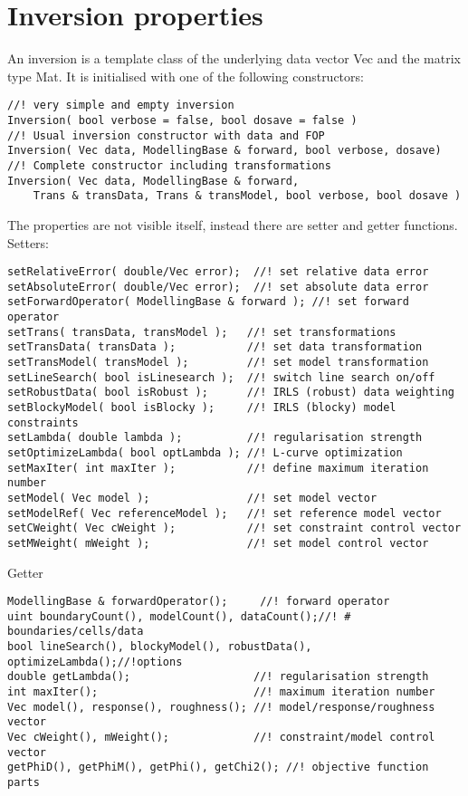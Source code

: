 \section{Inversion properties}
An inversion is a template class of the underlying data vector Vec and the matrix type Mat.
It is initialised with one of the following constructors:
\begin{lstlisting}
//! very simple and empty inversion
Inversion( bool verbose = false, bool dosave = false ) 
//! Usual inversion constructor with data and FOP
Inversion( Vec data, ModellingBase & forward, bool verbose, dosave)
//! Complete constructor including transformations
Inversion( Vec data, ModellingBase & forward, 
    Trans & transData, Trans & transModel, bool verbose, bool dosave )
\end{lstlisting}
The properties are not visible itself, instead there are setter and getter functions. Setters:
\begin{lstlisting}
setRelativeError( double/Vec error);  //! set relative data error
setAbsoluteError( double/Vec error);  //! set absolute data error
setForwardOperator( ModellingBase & forward ); //! set forward operator
setTrans( transData, transModel );   //! set transformations
setTransData( transData );           //! set data transformation
setTransModel( transModel );         //! set model transformation
setLineSearch( bool isLinesearch );  //! switch line search on/off
setRobustData( bool isRobust );      //! IRLS (robust) data weighting
setBlockyModel( bool isBlocky );     //! IRLS (blocky) model constraints
setLambda( double lambda );          //! regularisation strength
setOptimizeLambda( bool optLambda ); //! L-curve optimization
setMaxIter( int maxIter );           //! define maximum iteration number
setModel( Vec model );               //! set model vector
setModelRef( Vec referenceModel );   //! set reference model vector
setCWeight( Vec cWeight );           //! set constraint control vector
setMWeight( mWeight );               //! set model control vector
\end{lstlisting}
Getter%
\begin{lstlisting}
ModellingBase & forwardOperator();     //! forward operator
uint boundaryCount(), modelCount(), dataCount();//! # boundaries/cells/data
bool lineSearch(), blockyModel(), robustData(), optimizeLambda();//!options
double getLambda();                   //! regularisation strength
int maxIter();                        //! maximum iteration number
Vec model(), response(), roughness(); //! model/response/roughness vector
Vec cWeight(), mWeight();             //! constraint/model control vector
getPhiD(), getPhiM(), getPhi(), getChi2(); //! objective function parts
\end{lstlisting}
